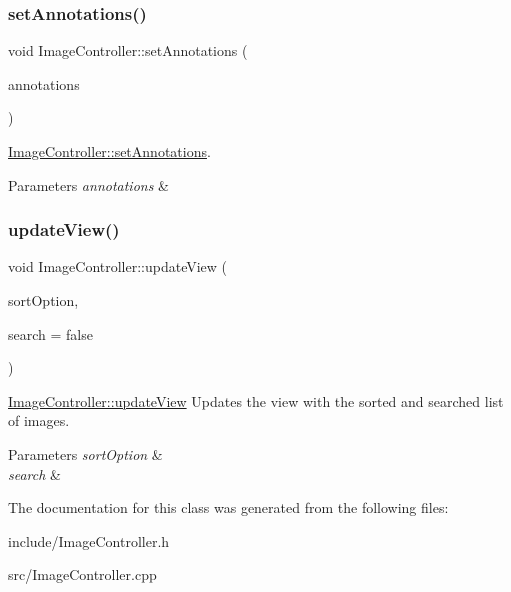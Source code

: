 \subsubsection{\texorpdfstring{set\+Annotations()}{setAnnotations()}}
{\footnotesize\ttfamily void Image\+Controller\+::set\+Annotations (\begin{DoxyParamCaption}\item[{\hyperlink{classLinkedList}{Linked\+List}$<$ Q\+Pair$<$ Q\+String, \hyperlink{classLinkedList}{Linked\+List}$<$ Q\+Pair$<$ int, int $>$$>$$>$$>$}]{annotations }\end{DoxyParamCaption})}



\hyperlink{classImageController_af9c9f284b985c7899a6bc3cf03e49191}{Image\+Controller\+::set\+Annotations}. 


\begin{DoxyParams}{Parameters}
{\em annotations} & \\
\hline
\end{DoxyParams}
\mbox{\label{classImageController_a351762bc38206af05dc21dc6e183b1c3}} 
\subsubsection{\texorpdfstring{update\+View()}{updateView()}}
{\footnotesize\ttfamily void Image\+Controller\+::update\+View (\begin{DoxyParamCaption}\item[{const Q\+String \&}]{sort\+Option,  }\item[{bool}]{search = {\ttfamily false} }\end{DoxyParamCaption})}



\hyperlink{classImageController_a3a300727ff5e30b19fcc0102427fdb30}{Image\+Controller\+::update\+View} Updates the view with the sorted and searched list of images. 


\begin{DoxyParams}{Parameters}
{\em sort\+Option} & \\
\hline
{\em search} & \\
\hline
\end{DoxyParams}


The documentation for this class was generated from the following files\+:\begin{DoxyCompactItemize}
\item 
include/Image\+Controller.\+h\item 
src/Image\+Controller.\+cpp\end{DoxyCompactItemize}
